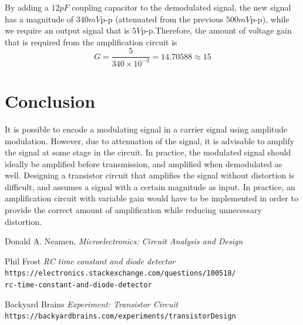 \documentclass[12pt, a4paper]{article}
\begin{document}
	By adding a $12pF$ coupling capacitor to the demodulated signal, the new signal has a magnitude of $340mV$p-p (attenuated from the previous $500mV$\mbox{p-p}), while we require an output signal that is $5V$p-p.Therefore, the amount of voltage gain that is required from the amplification circuit is
	\[
		G = \frac{5}{340\times 10^{-3}} = 14.70588 \approx 15
	\]

\section{Conclusion} %
\label{sec:conclusion}
	It is possible to encode a modulating signal in a carrier signal using amplitude modulation. However, due to attenuation of the signal, it is advisable to amplify the signal at some stage in the circuit. In practice, the modulated signal should ideally be amplified before transmission, and amplified when demodulated as well. Designing a transistor circuit that amplifies the signal without distortion is difficult, and assumes a signal with a certain magnitude as input. In practice, an amplification circuit with variable gain would have to be implemented in order to provide the correct amount of amplification while reducing unnecessary distortion.

\begin{thebibliography}{500}

	  Donald A. Neamen,
	  \textit{Microelectronics: Circuit Analysis and Design}

	Phil Frost
	\textit{RC time constant and diode detector}
	\texttt{https://electronics.stackexchange.com/questions/100518/\\rc-time-constant-and-diode-detector}

	Backyard Brains
	\textit{Experiment: Transistor Circuit}
	\texttt{https://backyardbrains.com/experiments/transistorDesign}

\end{thebibliography}
\end{document}
